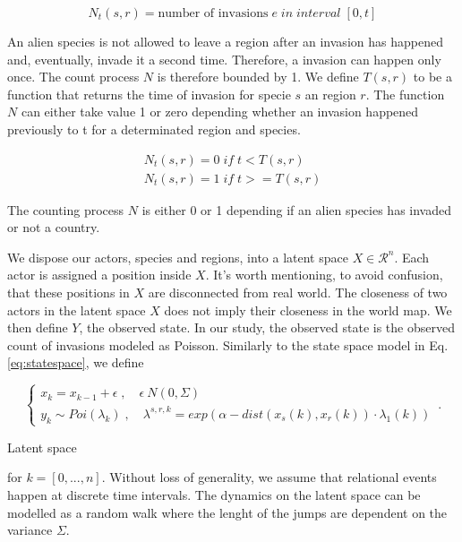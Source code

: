 \documentclass[mscthesis]{usiinfthesis}
\begin{document}
\[
N_t(s, r) = \textrm{number of invasions} \; e \; in \; interval \; [0, t]
\]

An alien species is not allowed to leave a region after an invasion has happened and, eventually, invade it a second time. Therefore, a invasion can happen only once. The count process $N$ is therefore bounded by 1. We define $T(s, r)$ to be a function that returns the time of invasion for specie $s$ an region $r$. The function $N$ can either take value 1 or zero depending whether an invasion happened previously to t for a determinated region and species.


\begin{eqfloat}
\begin{equation}
\begin{array}{l}
N_t(s, r) = 0 \; if \; t < T(s, r) \\
N_t(s, r) = 1 \; if \; t >= T(s, r)
\end{array}
\label{eq:counting process}
\end{equation}
\caption{The counting process $N$ is either 0 or 1 depending if an alien species has invaded or not a country.}
\end{eqfloat}


We dispose our actors, species and regions, into a latent space $X \in \mathcal{R}^n$. Each actor is assigned a position inside $X$. It's worth mentioning, to avoid confusion, that these positions in $X$ are disconnected from real world. The closeness of two actors in the latent space $X$ does not imply their closeness in the world map. We then define $Y$, the observed state. In our study, the observed state is the observed count of invasions modeled as Poisson. Similarly to the state space model in Eq. \ref{eq:statespace}, we define

\begin{eqfloat}
\begin{equation}
    \begin{cases}
      x_k = x_{k-1} + \epsilon \; , \quad \epsilon ~ N(0, \Sigma) \\
      y_k \sim Poi(\lambda_k) \; , \quad \lambda^{s, r, k} = exp\left(\alpha-dist(x_s(k), x_r(k)) \cdot \lambda_1(k) \right)
    \end{cases}\,.
\label{eq:latentspace}
\end{equation}
\caption{Latent space}
\end{eqfloat}

for $k = [0, ..., n]$. Without loss of generality, we assume that relational events happen at discrete time intervals. The dynamics on the latent space can be modelled as a random walk where the lenght of the jumps are dependent on the variance $\Sigma$.
\end{document}
